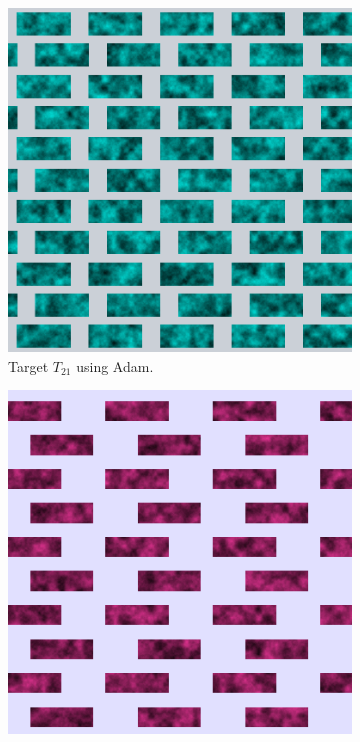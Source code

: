 \begin{figure}[h]
\centering
\begin{subfigure}[t]{.25\textwidth}
    \centering
    \includegraphics[width=\linewidth]{img/evaluation/M2/2param/Neural_Adam_final_render.png}
    \caption{Target $T_{21}$ using Adam.}
    \label{fig:M2NeuralFinalRenders2paramAdam}
\end{subfigure}\hspace{0.5cm}
\begin{subfigure}[t]{.25\textwidth}
    \centering
    \includegraphics[width=\linewidth]{img/evaluation/M2/random/Neural_Adam_Random_best.png}

\end{subfigure}
\end{figure}
